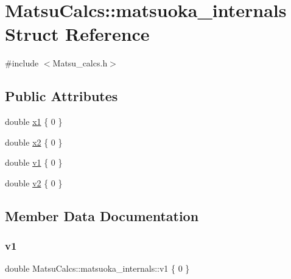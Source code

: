 \hypertarget{structMatsuCalcs_1_1matsuoka__internals}{}\section{Matsu\+Calcs\+:\+:matsuoka\+\_\+internals Struct Reference}
\label{structMatsuCalcs_1_1matsuoka__internals}


{\ttfamily \#include $<$Matsu\+\_\+calcs.\+h$>$}

\subsection*{Public Attributes}
\begin{DoxyCompactItemize}
\item 
double \mbox{\hyperlink{structMatsuCalcs_1_1matsuoka__internals_a94e9d15c2de229653c4bf4542cf7df34}{x1}} \{ 0 \}
\item 
double \mbox{\hyperlink{structMatsuCalcs_1_1matsuoka__internals_a5e8455597562089dae55b3b6598433ad}{x2}} \{ 0 \}
\item 
double \mbox{\hyperlink{structMatsuCalcs_1_1matsuoka__internals_ad6827ca11352d648dd80a538bb063efe}{v1}} \{ 0 \}
\item 
double \mbox{\hyperlink{structMatsuCalcs_1_1matsuoka__internals_aa43dda881aa69f2803f37f431e621320}{v2}} \{ 0 \}
\end{DoxyCompactItemize}


\subsection{Member Data Documentation}
\mbox{\label{structMatsuCalcs_1_1matsuoka__internals_ad6827ca11352d648dd80a538bb063efe}} 
\subsubsection{\texorpdfstring{v1}{v1}}
{\footnotesize\ttfamily double Matsu\+Calcs\+::matsuoka\+\_\+internals\+::v1 \{ 0 \}}

\mbox{\label{structMatsuCalcs_1_1matsuoka__internals_aa43dda881aa69f2803f37f431e621320}} 
